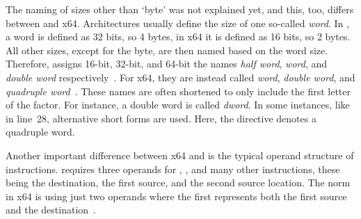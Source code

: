 The naming of sizes other than `byte' was not explained yet, and this, too, differs between \riscv{} and x64.
Architectures usually define the size of one so-called \emph{word}.
In \riscv{}, a word is defined as 32 bits, so 4 bytes, in x64 it is defined as 16 bits, so 2 bytes.
All other sizes, except for the byte, are then named based on the word size.
Therefore, \riscv{} assigns 16-bit, 32-bit, and 64-bit the names \emph{half word}, \emph{word}, and \emph{double word} respectively~\cite[p.~6]{Waterman2019}.
For x64, they are instead called \emph{word}, \emph{double word}, and \emph{quadruple word}~\cite[p.~3]{Kusswurm2018-nd}.
These names are often shortened to only include the first letter of the factor.
For instance, a double word is called \emph{dword}.
In some instances, like in line~28, alternative short forms are used.
Here, the directive  denotes a quadruple word.

Another important difference between x64 and \riscv{} is the typical operand structure of instructions.
\riscv{} requires three operands for , , and many other instructions, these being the destination, the first source, and the second source location.
The norm in x64 is using just two operands where the first represents both the first source and the destination~\cite[pp.~14--20]{Dandamudi2005Risc}.

